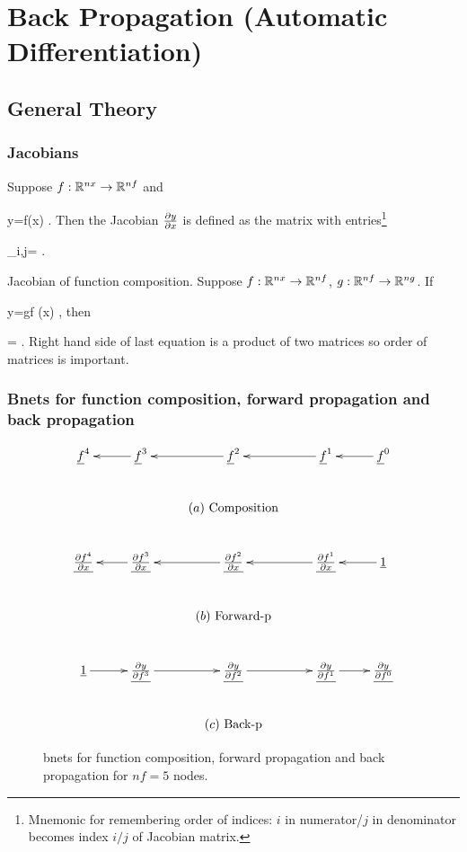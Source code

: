 \chapter{Back Propagation
 (Automatic Differentiation)}

\section{General Theory}

\subsection{Jacobians}

Suppose
 $f:{ \mathbb{R}}^{nx}\rightarrow { \mathbb{R}}^{nf}$
and 

\beq
y=f(x)
\;.
\eeq
Then the Jacobian $\frac{\partial y}{\partial x}$
is defined as the matrix with entries\footnote{
Mnemonic for remembering 
order of indices: $i$ in numerator/$j$ in denominator
becomes index $i/j$ of Jacobian matrix.}

\beq
{}_{i,j}=
\;.
\eeq




Jacobian of function composition.
Suppose $f:{ \mathbb{R}}^{nx}\rightarrow{ \mathbb{R}}^{nf}$,
$g:{ \mathbb{R}}^{nf}\rightarrow { \mathbb{R}}^{ng}$. If

\beq
y=g\circ f (x)
\;,
\eeq
then

\beq
{}
=
\;.
\eeq
Right hand side
of last equation 
is a product
of two matrices
so order of matrices is important.

\subsection{Bnets for function
composition, 
forward propagation and back propagation}



\begin{figure}[h!]
\centering
$$
\xymatrix{
\rvf^4
&
\rvf^3\ar[l]
&
\rvf^2\ar[l]
&
\rvf^1\ar[l]
&
\rvf^0\ar[l]
\\
&&\text{$(a)$ Composition}
\\
\ul{\pder{f^4}{x}}
&
\ul{\pder{f^3}{x}}\ar[l]
&
\ul{\pder{f^2}{x}}\ar[l]
&
\ul{\pder{f^1}{x}}\ar[l]
&
\ul{1}\ar[l]
\\
&&\text{$(b)$ Forward-p}
\\
\ul{1}\ar[r]
&
\ul{\pder{y}{f^3}}\ar[r]
&
\ul{\pder{y}{f^2}}\ar[r]
&
\ul{\pder{y}{f^1}}\ar[r]
&
\ul{\pder{y}{f^0}}
\\
&&\text{$(c)$ Back-p}
}
$$
\caption{bnets for function
composition,
forward propagation and back propagation
for $nf=5$ nodes.}
\label{fig-backp-abc}
\end{figure}


